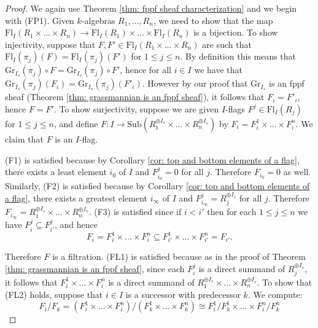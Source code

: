 \documentclass[oneside,11pt]{amsart}
\newcommand{\Fl}{\ensuremath{\text{Fl}}}
\newcommand{\Sub}{\ensuremath{\text{Sub}}}
\newcommand{\Gr}{\ensuremath{\text{Gr}}}
\theoremstyle{definition}
\newtheorem{proof techniques}{Proof Techniques}
\begin{document}
\begin{proof}
We again use Theorem \ref{thm: fppf sheaf characterization} and we begin with (FP1). Given $k$-algebras $R_1, \ldots,  R_n$, we need to show that the map $\Fl_I( R_1 \times \ldots \times R_n ) \to \Fl_I( R_1) \times \ldots \times \Fl_I(R_n )$ is a bijection. To show injectivity, suppose that $F , F' \in \Fl_I( R_1 \times \ldots \times R_n )$ are such that $\Fl_I( \pi_j )(F) = \Fl_I( \pi_j )(F')$ for $1 \leq j \leq n$. By definition this means that $\Gr_{I_s}(\pi_j) \circ F = \Gr_{I_s}(\pi_j) \circ F'$, hence for all $i \in I$ we have that $\Gr_{I_s}(\pi_j)(F_i) = \Gr_{I_s}(\pi_j)(F'_i)$. However by our proof that $\Gr_{I_s}$ is an fppf sheaf (Theorem \ref{thm: grassmannian is an fppf sheaf}), it follows that $F_i = F'_i$, hence $F = F'$. To show surjectivity, suppose we are given $I$-flags $F^j \in \Fl_I(R_j)$ for $1 \leq j \leq n$, and define $F : I \to \Sub( R_1^{\oplus I_s} \times \ldots \times R_n^{\oplus I_s})$ by $F_i = F_i^1 \times \ldots \times F_i^n$. We claim that $F$ is an $I$-flag. 



(F1) is satisfied because by Corollary \ref{cor: top and bottom elements of a flag}, there exists a least element $i_0$ of $I$ and $F^j_{i_0} = 0$ for all $j$. Therefore $F_{i_0} = 0$ as well. Similarly, (F2) is satisfied because by Corollary \ref{cor: top and bottom elements of a flag}, there exists a greatest element $i_\infty$ of $I$ and $F^j_{i_\infty} = R_j^{\oplus I_s}$ for all $j$. Therefore $F_{i_\infty} = R_1^{\oplus I_s} \times \ldots \times R_n^{\oplus I_s}$. (F3) is satisfied since if $i < i'$ then for each $1 \leq j \leq n$ we have $F^j_i \subseteq F^j_{i'}$, and hence 
\begin{equation*}
F_i = F_i^1 \times \ldots \times F_i^n \subseteq F_{i'}^1 \times \ldots \times F_{i'}^n = F_{i'}. 
\end{equation*}

Therefore $F$ is a filtration. (FL1) is satisfied because as in the proof of Theorem \ref{thm: grassmannian is an fppf sheaf}, since each $F_i^j$ is a direct summand of $R_j^{\oplus I_s}$, it follows that $F_i^1 \times \ldots \times F_i^n$ is a direct summand of $R_1^{\oplus I_s} \times \ldots \times R_n^{\oplus I_s}$. To show that (FL2) holds, suppose that $i \in I$ is a successor with predecessor $k$. We compute:  
\begin{equation*}
F_i / F_k = (F_i^1 \times \ldots \times F_i^n) / (F_k^1 \times \ldots \times F_k^n) \cong F_i^1 / F_k^1 \times \ldots \times F_i^n  / F_k^n
\end{equation*}


\end{proof}
\end{document}
